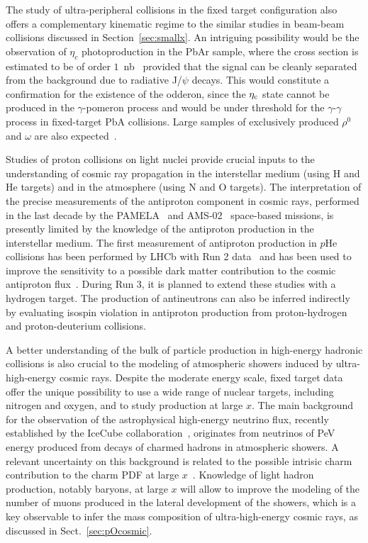 \documentclass[../report.tex]{subfiles}
\begin{document}
The study of ultra-peripheral collisions in the fixed target
configuration also offers a complementary kinematic regime to
the similar studies in beam-beam collisions discussed in
Section~\ref{sec:smallx}. 
An intriguing possibility would be the observation of $\eta_c$ photoproduction in the PbAr sample, where the cross
section is estimated to be of order $1$~nb~\cite{Goncalves:2015hra} provided that the signal can be cleanly separated from the background due to radiative J/$\psi$ decays. This would constitute 
a confirmation for the existence of the odderon, since the $\eta_{\rm c}$ state cannot be produced in the $\gamma$-pomeron 
process and would be under threshold for the $\gamma$-$\gamma$ process in fixed-target PbA collisions.
Large samples of exclusively produced $\rho^0$ and $\omega$ are also expected~\cite{Goncalves:2018htp}.


Studies of proton collisions on light nuclei provide crucial inputs to the
understanding of cosmic ray propagation in the interstellar medium
(using H and He targets) and in the atmosphere (using N and O
targets). The interpretation of the precise measurements of the
antiproton component in cosmic rays, performed in the last decade by the
PAMELA~\cite{Pamela} and AMS-02~\cite{AMS02} space-based missions, is
presently limited by the knowledge of the antiproton production
in the interstellar medium. The first measurement of antiproton production
in $p$He collisions has been performed by LHCb with Run 2
data~\cite{Aaij:2018svt} and has been used to improve the 
sensitivity to a possible dark matter contribution to the cosmic antiproton
flux~\cite{Reinert:2017aga,Korsmeier:2018gcy}. 
During Run 3, it is planned to extend these studies with a hydrogen
target. The production of antineutrons can also be inferred indirectly
by evaluating isospin violation in antiproton production 
from proton-hydrogen and proton-deuterium collisions.

A better understanding of the bulk of particle production in
high-energy hadronic collisions is also crucial to the modeling of
atmospheric showers induced by ultra-high-energy cosmic rays. 
Despite the moderate energy scale, fixed target data offer the
unique possibility to use a wide range of nuclear targets, including
nitrogen and oxygen, and to study production at large $x$. 
The main background for the observation of the astrophysical
high-energy neutrino flux, recently established by 
the IceCube collaboration~\cite{Aartsen:2013jdh}, originates from
neutrinos of PeV energy produced from decays of charmed hadrons in
atmospheric showers. A relevant uncertainty on this background
is related to the possible intrisic charm contribution to the charm
PDF at large $x$~\cite{Laha:2016dri}.  
Knowledge of light hadron production, notably baryons, at large $x$ will allow 
to improve the modeling of the number of muons produced in the lateral
development of the showers, which is a key observable to infer the
mass composition of ultra-high-energy cosmic rays, as discussed in Sect.~\ref{sec:pOcosmic}.
\end{document}
